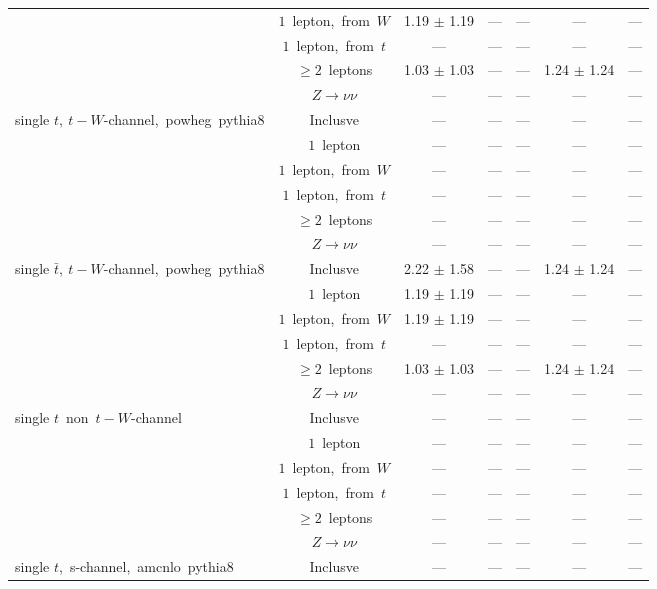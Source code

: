 \documentclass{article}
\begin{document}
\begin{longtable}{|l|c|c|c|c|c|c|}
 & $1$~lepton,~from~$W$  & 1.19 $\pm$ 1.19  & ---  & ---  & ---  & --- \\* 
 & $1$~lepton,~from~$t$  & ---  & ---  & ---  & ---  & --- \\* 
 & $\ge2$~leptons  & 1.03 $\pm$ 1.03  & ---  & ---  & 1.24 $\pm$ 1.24  & --- \\* 
 & $Z\rightarrow\nu\nu$  & ---  & ---  & ---  & ---  & --- \\* 
\hline 
\multirow{6}{*}{single $t,~t-W$-channel,~powheg~pythia8} & Inclusve  & ---  & ---  & ---  & ---  & --- \\* 
 & $1$~lepton  & ---  & ---  & ---  & ---  & --- \\* 
 & $1$~lepton,~from~$W$  & ---  & ---  & ---  & ---  & --- \\* 
 & $1$~lepton,~from~$t$  & ---  & ---  & ---  & ---  & --- \\* 
 & $\ge2$~leptons  & ---  & ---  & ---  & ---  & --- \\* 
 & $Z\rightarrow\nu\nu$  & ---  & ---  & ---  & ---  & --- \\* 
\hline 
\multirow{6}{*}{single $\bar{t},~t-W$-channel,~powheg~pythia8} & Inclusve  & 2.22 $\pm$ 1.58  & ---  & ---  & 1.24 $\pm$ 1.24  & --- \\* 
 & $1$~lepton  & 1.19 $\pm$ 1.19  & ---  & ---  & ---  & --- \\* 
 & $1$~lepton,~from~$W$  & 1.19 $\pm$ 1.19  & ---  & ---  & ---  & --- \\* 
 & $1$~lepton,~from~$t$  & ---  & ---  & ---  & ---  & --- \\* 
 & $\ge2$~leptons  & 1.03 $\pm$ 1.03  & ---  & ---  & 1.24 $\pm$ 1.24  & --- \\* 
 & $Z\rightarrow\nu\nu$  & ---  & ---  & ---  & ---  & --- \\* 
\hline 
\multirow{6}{*}{single $t$~non~$t-W$-channel} & Inclusve  & ---  & ---  & ---  & ---  & --- \\* 
 & $1$~lepton  & ---  & ---  & ---  & ---  & --- \\* 
 & $1$~lepton,~from~$W$  & ---  & ---  & ---  & ---  & --- \\* 
 & $1$~lepton,~from~$t$  & ---  & ---  & ---  & ---  & --- \\* 
 & $\ge2$~leptons  & ---  & ---  & ---  & ---  & --- \\* 
 & $Z\rightarrow\nu\nu$  & ---  & ---  & ---  & ---  & --- \\* 
\hline 
\multirow{6}{*}{single $t$,~s-channel,~amcnlo~pythia8} & Inclusve  & ---  & ---  & ---  & ---  & --- \\* 

\end{longtable}
\end{document}
